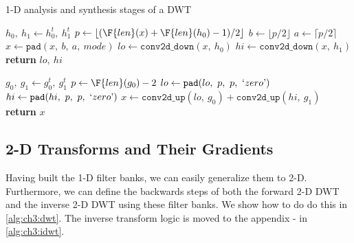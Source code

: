 \begin{algorithm}[tb]
\caption{1-D analysis and synthesis stages of a DWT}\label{alg:ch3:fb1d}
\begin{algorithmic}[1]
  \label{alg:ch3:afb1d}
    \State $h_0,\ h_1 \gets h_0^t,\ h_1^t$  
  \EndIf
  \State $p \gets \lfloor (\F{len}(x) + \F{len}(h_0) - 1) / 2 \rfloor$ 
  \State $b \gets \lfloor p/2 \rfloor$ 
  \State $a \gets \lceil p/2 \rceil$ 
  \State $x \gets \mathtt{pad}(x,\ b,\ a,\ mode)$ 
  \State $lo \gets \mathtt{conv2d\_down} (x,\ h_0)$
  \State $hi \gets \mathtt{conv2d\_down} (x,\ h_1)$
  \State \textbf{return} $lo,\ hi$
\EndFunction
\end{algorithmic}\vspace{10pt}
\begin{algorithmic}[1]
  \label{alg:ch3:sfb1d}
    \State $g_0,\ g_1 \gets g_0^t,\ g_1^t$  
  \EndIf
  \State $p \gets \F{len}(g_0) - 2$ 
  \State $lo \gets \mathtt{pad}(lo,\ p,\ p,\ `zero \textrm')$ 
  \State $hi \gets \mathtt{pad}(hi,\ p,\ p,\ `zero \textrm')$ 
  \State $x \gets \mathtt{conv2d\_up}(lo,\ g_0) + \mathtt{conv2d\_up}(hi,\ g_1)$
  \State \textbf{return} $x$
\EndFunction
\end{algorithmic}
\end{algorithm}

\subsection{2-D Transforms and Their Gradients}
Having built the 1-D filter banks, we can easily generalize them to 2-D.
Furthermore, we can define the backwards steps of both the forward 2-D DWT
and the inverse 2-D DWT using these filter banks. We show how to do do this in
\autoref{alg:ch3:dwt}. The inverse transform logic is moved to the appendix - in
\autoref{alg:ch3:idwt}.

